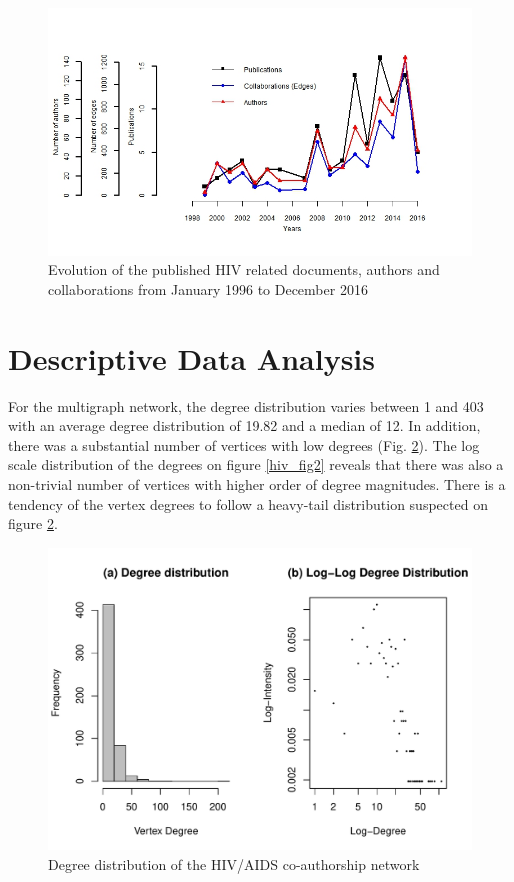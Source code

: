\begin{figure}[h!]
\centering
\includegraphics[scale=0.65]{Chapters/hiv/pubDist}
\caption{Evolution of the published HIV related documents, authors and collaborations from January 1996 to December 2016}
\label{hiv_pubDist}
\end{figure}

\section{Descriptive Data Analysis}
\label{sec:hiv_descstat}
For the multigraph network, the degree distribution varies between 1 and 403 with an average degree distribution of 19.82 and a median of 12. In addition, there was a substantial number of vertices with low degrees (Fig. \ref{hiv_fig1}). The log scale distribution of the degrees on figure \ref{hiv_fig2} reveals that there was also a non-trivial number of vertices with higher order of degree magnitudes. There is a tendency of the vertex degrees to follow a heavy-tail distribution suspected on figure \ref{hiv_fig1}.

\begin{figure}[h!]
\centering
\includegraphics[scale=0.65]{Chapters/hiv/degreeDistribution}
\caption{Degree distribution of the HIV/AIDS co-authorship network}
\label{hiv_fig1}
\end{figure}

